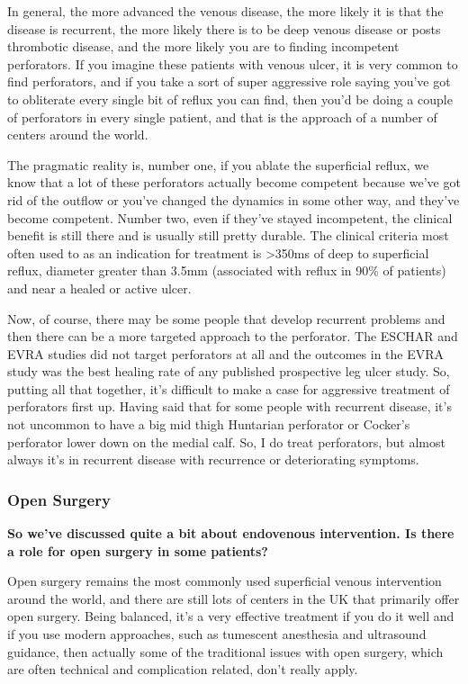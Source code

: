 \documentclass[
]{book}
\begin{document}
In general, the more advanced the venous disease, the more likely it is
that the disease is recurrent, the more likely there is to be deep
venous disease or posts thrombotic disease, and the more likely you are
to finding incompetent perforators. If you imagine these patients with
venous ulcer, it is very common to find perforators, and if you take a
sort of super aggressive role saying you've got to obliterate every
single bit of reflux you can find, then you'd be doing a couple of
perforators in every single patient, and that is the approach of a
number of centers around the world.

The pragmatic reality is, number one, if you ablate the superficial
reflux, we know that a lot of these perforators actually become
competent because we've got rid of the outflow or you've changed the
dynamics in some other way, and they've become competent. Number two,
even if they've stayed incompetent, the clinical benefit is still there
and is usually still pretty durable. The clinical criteria most often
used to as an indication for treatment is \textgreater350ms of deep to superficial
reflux, diameter greater than 3.5mm (associated with reflux in 90\% of
patients)\citep{sandri1999} and near a healed or active ulcer.\citep{odonnell2014, min2003, rueda2013}

Now, of course, there may be some people that develop recurrent problems
and then there can be a more targeted approach to the perforator. The
ESCHAR and EVRA studies did not target perforators at all and the
outcomes in the EVRA study was the best healing rate of any published
prospective leg ulcer study. So, putting all that together, it's
difficult to make a case for aggressive treatment of perforators first
up. Having said that for some people with recurrent disease, it's not
uncommon to have a big mid thigh Huntarian perforator or Cocker's
perforator lower down on the medial calf. So, I do treat perforators,
but almost always it's in recurrent disease with recurrence or
deteriorating symptoms.

\hypertarget{open-surgery-1}{%
\subsubsection{Open Surgery}\label{open-surgery-1}}

\textbf{So we've discussed quite a bit about endovenous intervention. Is there
a role for open surgery in some patients?}

Open surgery remains the most commonly used superficial venous
intervention around the world, and there are still lots of centers in
the UK that primarily offer open surgery. Being balanced, it's a very
effective treatment if you do it well and if you use modern approaches,
such as tumescent anesthesia and ultrasound guidance, then actually some
of the traditional issues with open surgery, which are often technical
and complication related, don't really apply.
\end{document}
